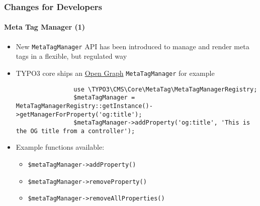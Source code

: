 
\begin{frame}[fragile]
	\frametitle{Changes for Developers}
	\framesubtitle{Meta Tag Manager (1)}

	\lstset{basicstyle=\tiny\ttfamily}

	\begin{itemize}
		\item New \texttt{MetaTagManager} API has been introduced to manage and
			render meta tags in a flexible, but regulated way
		\item TYPO3 core ships an \href{http://ogp.me/}{Open Graph}
			\texttt{MetaTagManager} for example

			\begin{lstlisting}
				use \TYPO3\CMS\Core\MetaTag\MetaTagManagerRegistry;
				$metaTagManager = MetaTagManagerRegistry::getInstance()->getManagerForProperty('og:title');
				$metaTagManager->addProperty('og:title', 'This is the OG title from a controller');
			\end{lstlisting}

		\item Example functions available:

			\begin{itemize}
				\smaller
					\item \texttt{\$metaTagManager->addProperty()}
					\item \texttt{\$metaTagManager->removeProperty()}
					\item \texttt{\$metaTagManager->removeAllProperties()}
			\end{itemize}

	\end{itemize}

\end{frame}


